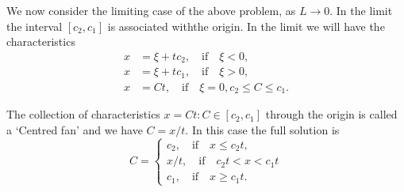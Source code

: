 We now consider the limiting case of the above problem, as $L\to 0$. In the limit the interval $[c_2,c_1]$ is associated with\pageoriginale the origin. In the limit we will have the characteristics
\begin{align*}
x&=\xi+t c_2,\quad\text{if}\quad \xi<0,\\
x&=\xi+t c_1,\quad\text{if}\quad \xi>0,\\
x&=Ct,\quad\text{if}\quad \xi=0, c_2\leq C\leq c_1.
\end{align*}

The collection of characteristics $x=Ct:C\in[c_2, c_1]$ through the origin is called a `Centred fan' and we have $C=x/t$. In this case the full solution is 
\begin{equation}
C=
\begin{cases}
c_2,\quad\text{if}\quad x \leq c_2 t,\\
x/t,\quad\text{if}\quad c_2 t<x< c_1 t\\
c_1,\quad\text{if}\quad x\geq c_1 t.
\end{cases}\tag{1.17}\label{chap1:eq1.17}
\end{equation}

